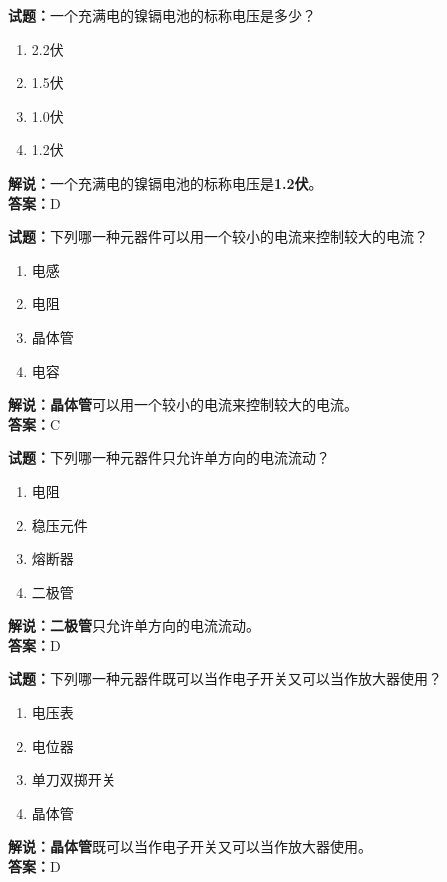 \documentclass{ctexbook}
\begin{document}
\bigskip


\noindent\textbf{试题：}一个充满电的镍镉电池的标称电压是多少？
\begin{enumerate}[leftmargin=3em]
\item 2.2伏
\item 1.5伏
\item 1.0伏
\item 1.2伏
\end{enumerate}
\noindent\textbf{解说：}一个充满电的镍镉电池的标称电压是\textbf{1.2伏}。\\\noindent\textbf{答案：}D



\bigskip


\noindent\textbf{试题：}下列哪一种元器件可以用一个较小的电流来控制较大的电流？
\begin{enumerate}[leftmargin=3em]
\item 电感
\item 电阻
\item 晶体管
\item 电容
\end{enumerate}
\noindent\textbf{解说：}\textbf{晶体管}可以用一个较小的电流来控制较大的电流。\\\noindent\textbf{答案：}C



\bigskip


\noindent\textbf{试题：}下列哪一种元器件只允许单方向的电流流动？
\begin{enumerate}[leftmargin=3em]
\item 电阻
\item 稳压元件
\item 熔断器
\item 二极管
\end{enumerate}
\noindent\textbf{解说：}\textbf{二极管}只允许单方向的电流流动。\\\noindent\textbf{答案：}D




\bigskip


\noindent\textbf{试题：}下列哪一种元器件既可以当作电子开关又可以当作放大器使用？
\begin{enumerate}[leftmargin=3em]
\item 电压表
\item 电位器
\item 单刀双掷开关
\item 晶体管
\end{enumerate}
\noindent\textbf{解说：}\textbf{晶体管}既可以当作电子开关又可以当作放大器使用。\\\noindent\textbf{答案：}D
\end{document}

